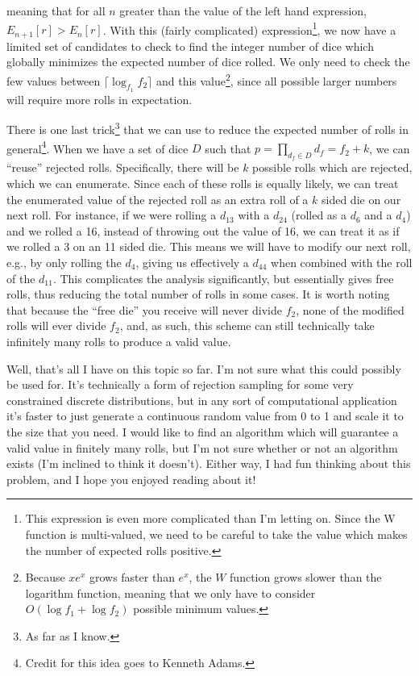 \documentclass{article}
\begin{document}
meaning that for all $n$ greater than the value of the left hand expression, $E_{n+1}[r] > E_n[r]$.
With this (fairly complicated) expression\footnote{This expression is even more complicated than I'm letting on. Since the W function is multi-valued, we need to be careful to take the value which makes the number of expected rolls positive.}, we now have a limited set of candidates to check to find the integer number of dice which globally minimizes the expected number of dice rolled.
We only need to check the few values between $\lceil \log_{f_1}{f_2} \rceil$ and this value\footnote{Because $xe^x$ grows faster than $e^x$, the $W$ function grows slower than the logarithm function, meaning that we only have to consider $O(\log{f_1} + \log{f_2})$ possible minimum values.}, since all possible larger numbers will require more rolls in expectation. %

\par There is one last trick\footnote{As far as I know.} that we can use to reduce the expected number of rolls in general\footnote{Credit for this idea goes to Kenneth Adams.}.
When we have a set of dice $D$ such that $p = \prod_{d_f\in D}d_f = f_2 + k$, we can ``reuse'' rejected rolls.
Specifically, there will be $k$ possible rolls which are rejected, which we can enumerate.
Since each of these rolls is equally likely, we can treat the enumerated value of the rejected roll as an extra roll of a $k$ sided die on our next roll.
For instance, if we were rolling a $d_{13}$ with a $d_{24}$ (rolled as a $d_6$ and a $d_4$) and we rolled a 16, instead of throwing out the value of 16, we can treat it as if we rolled a 3 on an 11 sided die.
This means we will have to modify our next roll, e.g., by only rolling the $d_4$, giving us effectively a $d_{44}$ when combined with the roll of the $d_{11}$.
This complicates the analysis significantly, but essentially gives free rolls, thus reducing the total number of rolls in some cases.
It is worth noting that because the ``free die'' you receive will never divide $f_2$, none of the modified rolls will ever divide $f_2$, and, as such, this scheme can still technically take infinitely many rolls to produce a valid value.

\par Well, that's all I have on this topic so far. 
I'm not sure what this could possibly be used for.
It's technically a form of rejection sampling for some very constrained discrete distributions, but in any sort of computational application it's faster to just generate a continuous random value from 0 to 1 and scale it to the size that you need.
I would like to find an algorithm which will guarantee a valid value in finitely many rolls, but I'm not sure whether or not an algorithm exists (I'm inclined to think it doesn't).
Either way, I had fun thinking about this problem, and I hope you enjoyed reading about it!
\end{document}
